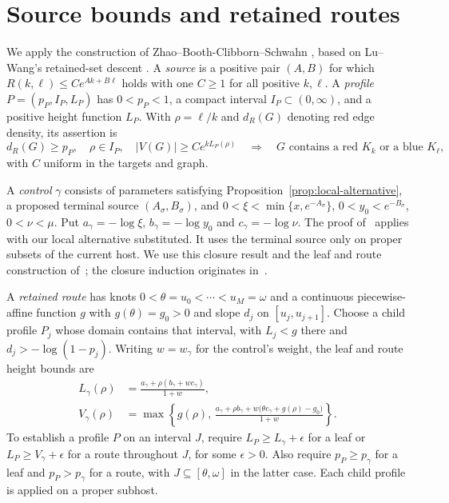 \section{Source bounds and retained routes}
\label{sec:global-construction}

We apply the construction of Zhao--Booth-Clibborn--Schwahn
\cite[Sections~4--5]{ZBS}, based on Lu--Wang's retained-set descent
\cite[Theorem~2]{LW}. A \emph{source} is a positive pair $(A,B)$ for
which $R(k,\ell)\le Ce^{Ak+B\ell}$ holds with one $C\ge1$ for all
positive $k,\ell$. A \emph{profile} $P=(p_P,I_P,L_P)$ has
$0<p_P<1$, a compact interval $I_P\subset(0,\infty)$, and a positive
height function $L_P$. With $\rho=\ell/k$ and $d_R(G)$ denoting red
edge density, its assertion is
\begin{equation}\label{eq:profile}
 d_R(G)\ge p_P,\quad \rho\in I_P,\quad
 |V(G)|\ge Ce^{kL_P(\rho)}
 \quad\Longrightarrow\quad
 G\text{ contains a red }K_k\text{ or a blue }K_\ell,
\end{equation}
with $C$ uniform in the targets and graph.

A \emph{control} $\gamma$ consists of parameters satisfying
Proposition~\ref{prop:local-alternative}, a proposed terminal source
$(A_\sigma,B_\sigma)$, and
$0<\xi<\min\{x,e^{-A_\sigma}\}$, $0<y_0<e^{-B_\sigma}$,
$0<\nu<\mu$. Put $a_\gamma=-\log\xi$, $b_\gamma=-\log y_0$ and
$c_\gamma=-\log\nu$.
The proof of~\cite[Theorem~4.2, Section~4.3]{ZBS} applies with our local
alternative substituted. It uses the terminal source only on proper
subsets of the current host. We use this closure result and the leaf
and route construction of~\cite[Definition~5.4 and Lemma~5.8]{ZBS};
the closure induction originates in~\cite[Lemma~A.1]{LW}.

A \emph{retained route} has knots
$0<\theta=u_0<\cdots<u_M=\omega$ and a continuous piecewise-affine
function $g$ with $g(\theta)=g_0>0$ and slope $d_j$ on
$[u_j,u_{j+1}]$. Choose a child profile $P_j$ whose domain contains
that interval, with $L_j<g$ there and $d_j>-\log(1-p_j)$.
Writing $w=w_\gamma$ for the control's weight, the leaf and route height bounds are
\begin{equation}\label{eq:route-output}
 \begin{aligned}
 L_\gamma(\rho)&=\frac{a_\gamma+\rho(b_\gamma+wc_\gamma)}{1+w},\\
 V_\gamma(\rho)&=\max\left\{g(\rho),\,
 \frac{a_\gamma+\rho b_\gamma+
 w\bigl(\theta c_\gamma+g(\rho)-g_0\bigr)}{1+w}\right\}.
 \end{aligned}
\end{equation}
To establish a profile $P$ on an interval $J$, require
$L_P\ge L_\gamma+\epsilon$ for a leaf or
$L_P\ge V_\gamma+\epsilon$ for a route throughout $J$, for some
$\epsilon>0$. Also require $p_P\ge p_\gamma$ for a leaf and
$p_P>p_\gamma$ for a route, with $J\subseteq[\theta,\omega]$ in the latter case.
Each child profile is applied on a proper subhost.

